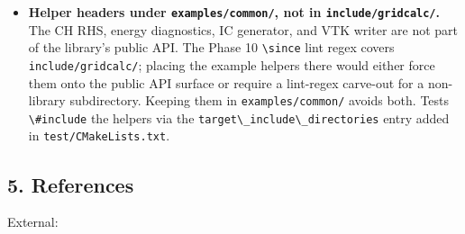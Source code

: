 \begin{itemize}
  (qualitative match to published CH images) plus the programmatic
  \passthrough{\lstinline!CahnHilliardCoarseningRun!} tests in CI
  (Lyapunov decay, monotone coarsening of the gradient energy, mass
  conservation). A quantitative \(R(t)\sim t^{1/3}\) power-law fit was
  considered and rejected for this phase: at the affordable grid size
  the slope estimate is noisy enough that any threshold band wide
  enough to be robust would also be uninformative. Could ship later
  as a separate non-CI benchmark.
\item
  \textbf{Helper headers under
  \passthrough{\lstinline!examples/common/!}, not in
  \passthrough{\lstinline!include/gridcalc/!}.} The CH RHS, energy
  diagnostics, IC generator, and VTK writer are not part of the
  library's public API. The Phase 10 \passthrough{\lstinline!\\since!}
  lint regex covers \passthrough{\lstinline!include/gridcalc/!}; placing
  the example helpers there would either force them onto the public
  API surface or require a lint-regex carve-out for a non-library
  subdirectory. Keeping them in
  \passthrough{\lstinline!examples/common/!} avoids both. Tests
  \passthrough{\lstinline!\#include!} the helpers via the
  \passthrough{\lstinline!target\_include\_directories!} entry added
  in \passthrough{\lstinline!test/CMakeLists.txt!}.
\end{itemize}

\subsection{5. References}\label{phase12-references}

External:

